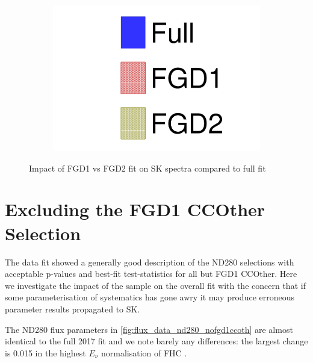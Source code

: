 \begin{figure}[h]
\begin{subfigure}[t]{0.32\textwidth}
		\includegraphics[width=\textwidth, trim={0mm 0mm 0mm 0mm}, clip, page=6]{figures/mach3/data/alt/try_2017_fit_on_sk_spectra_posterior_sk_error_fgd1only_spectra_posterior_sk_error_fgd2only_spectra}
	\end{subfigure}
	\caption{Impact of FGD1 vs FGD2 fit on SK spectra compared to full fit}
	\label{fig:sk_fgd1vsfgd2}
\end{figure}

\section{Excluding the FGD1 CCOther Selection}
The data fit showed a generally good description of the ND280 selections with acceptable p-values and best-fit test-statistics for all but FGD1 CCOther. Here we investigate the impact of the sample on the overall fit with the concern that if some parameterisation of systematics has gone awry it may produce erroneous parameter results propagated to SK. 

The ND280 flux parameters in \autoref{fig:flux_data_nd280_nofgd1ccoth} are almost identical to the full 2017 fit and we note barely any differences: the largest change is 0.015 in the highest $E_\nu$ normalisation of FHC \numu.

